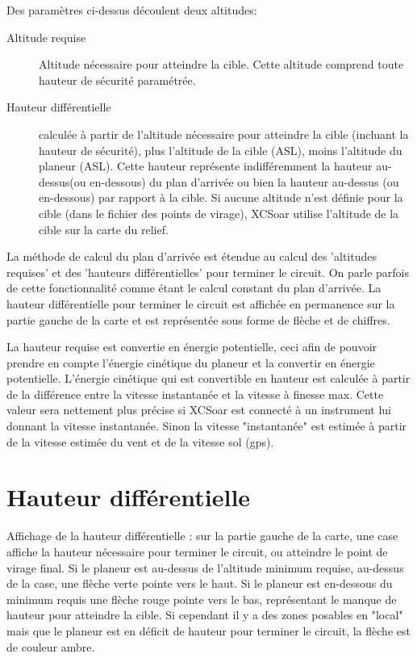 Des paramètres ci-dessus découlent deux altitudes:
\begin{description}
\item[Altitude requise] Altitude nécessaire pour atteindre la cible. Cette altitude comprend toute hauteur de sécurité paramétrée.
\item[Hauteur différentielle] calculée à partir de l'altitude nécessaire pour atteindre la cible (incluant la hauteur de sécurité), plus l'altitude de la cible (ASL), moins l'altitude du planeur (ASL). Cette hauteur représente indifféremment la hauteur au-dessus(ou en-dessous) du plan d'arrivée ou bien  la hauteur au-dessus (ou en-dessous) par rapport à la cible. Si aucune altitude n'est définie pour la cible (dans le fichier des points de virage), XCSoar utilise l'altitude de la cible sur la carte du relief.
\end{description}

La méthode de calcul du plan d'arrivée est étendue au calcul des 'altitudes requises' et des 'hauteurs différentielles'  pour terminer le circuit. On parle parfois de cette fonctionnalité comme étant le calcul constant du plan d'arrivée. La hauteur différentielle pour terminer le circuit est affichée en permanence sur la partie gauche de la carte et est représentée sous forme de flèche et de chiffres.

La hauteur requise est convertie en énergie potentielle, ceci afin de pouvoir prendre en compte l'énergie cinétique du planeur et la convertir en énergie potentielle. L'énergie cinétique qui est convertible en hauteur est calculée à partir de la différence entre la vitesse instantanée et la vitesse à finesse max. Cette valeur sera nettement plus précise si XCSoar est connecté à un instrument lui donnant la vitesse instantanée. Sinon la vitesse "instantanée" est estimée à partir de la vitesse estimée du vent et de la vitesse sol (gps).

\section{Hauteur différentielle}

Affichage de la hauteur différentielle : sur la partie gauche de la carte, une case affiche la hauteur nécessaire pour terminer le circuit, ou atteindre le point de virage final. Si le planeur est au-dessus de l'altitude minimum requise, au-dessus de la case, une flèche verte pointe vers le haut. Si le planeur est en-dessous du minimum requis une flèche rouge pointe vers le bas, représentant le manque de hauteur pour atteindre la cible. Si cependant il y a des zones posables en "local" mais que le planeur est en déficit de hauteur pour terminer le circuit, la flèche est de couleur ambre.

